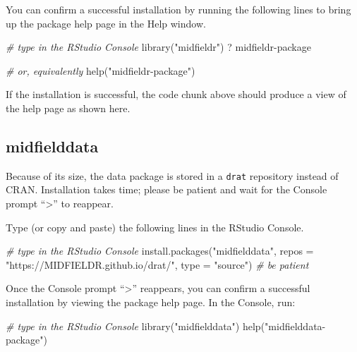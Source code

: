 \documentclass[
]{book}
\newenvironment{Shaded}{\begin{snugshade}}{\end{snugshade}}
\newcommand{\AttributeTok}[1]{\textcolor[rgb]{0.77,0.63,0.00}{#1}}
\newcommand{\CommentTok}[1]{\textcolor[rgb]{0.56,0.35,0.01}{\textit{#1}}}
\newcommand{\FunctionTok}[1]{\textcolor[rgb]{0.00,0.00,0.00}{#1}}
\newcommand{\NormalTok}[1]{#1}
\newcommand{\StringTok}[1]{\textcolor[rgb]{0.31,0.60,0.02}{#1}}
\begin{document}
You can confirm a successful installation by running the following lines to bring up the package help page in the Help window.

\begin{Shaded}
\begin{Highlighting}[]
\CommentTok{\# type in the RStudio Console }
\FunctionTok{library}\NormalTok{(}\StringTok{"midfieldr"}\NormalTok{)}
\NormalTok{? }\StringTok{\textasciigrave{}}\AttributeTok{midfieldr{-}package}\StringTok{\textasciigrave{}}

\CommentTok{\# or, equivalently}
\FunctionTok{help}\NormalTok{(}\StringTok{"midfieldr{-}package"}\NormalTok{)}
\end{Highlighting}
\end{Shaded}

If the installation is successful, the code chunk above should produce a view of the help page as shown here.

\hypertarget{midfielddata}{%
\subsection{midfielddata}\label{midfielddata}}

Because of its size, the data package is stored in a \texttt{drat} repository instead of CRAN. Installation takes time; please be patient and wait for the Console prompt ``\textgreater{}'' to reappear.

Type (or copy and paste) the following lines in the RStudio Console.

\begin{Shaded}
\begin{Highlighting}[]
\CommentTok{\# type in the RStudio Console  }
\FunctionTok{install.packages}\NormalTok{(}\StringTok{"midfielddata"}\NormalTok{, }
                 \AttributeTok{repos =} \StringTok{"https://MIDFIELDR.github.io/drat/"}\NormalTok{, }
                 \AttributeTok{type =} \StringTok{"source"}\NormalTok{)}
\CommentTok{\# be patient}
\end{Highlighting}
\end{Shaded}

Once the Console prompt ``\textgreater{}'' reappears, you can confirm a successful installation by viewing the package help page. In the Console, run:

\begin{Shaded}
\begin{Highlighting}[]
\CommentTok{\# type in the RStudio Console  }
\FunctionTok{library}\NormalTok{(}\StringTok{"midfielddata"}\NormalTok{)}
\FunctionTok{help}\NormalTok{(}\StringTok{"midfielddata{-}package"}\NormalTok{)}
\end{Highlighting}
\end{Shaded}
\end{document}

